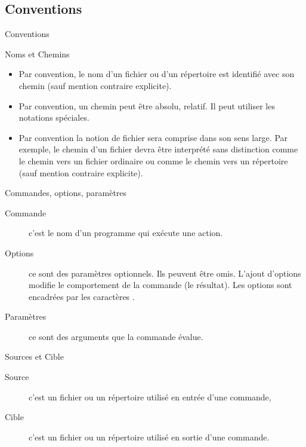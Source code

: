 \subsection{Conventions}
\begin{frame}{Conventions}
  \begin{block}{Noms et Chemins}
    \begin{itemize}
    \item Par convention, le nom d'un fichier ou d'un répertoire est identifié avec son chemin (sauf mention contraire explicite).
    \item Par convention, un chemin peut être absolu, relatif. Il peut utiliser les notations spéciales.
    \item Par convention la notion de fichier sera comprise dans son sens large. Par exemple, le chemin d'un fichier devra être interprété sans distinction comme le chemin vers un fichier ordinaire ou comme le chemin vers un répertoire (sauf mention contraire explicite).
    \end{itemize}
  \end{block}
  \begin{block}{Commandes, options, paramètres}
    \begin{description}
    \item[Commande] c'est le nom d'un programme qui exécute une action.
    \item[Options] ce sont des paramètres optionnels. Ils peuvent être omis. L'ajout d'options modifie le comportement de la commande (le résultat). Les options sont encadrées par les caractères .
    \item[Paramètres] ce sont des arguments que la commande évalue.
    \end{description}
  \end{block}
  \begin{block}{Sources et Cible}
    \begin{description}
    \item[Source] c'est un fichier ou un répertoire utilisé en entrée d'une commande,
    \item[Cible] c'est un fichier ou un répertoire utilisé en sortie d'une commande.
    \end{description}
  \end{block}
\end{frame}
